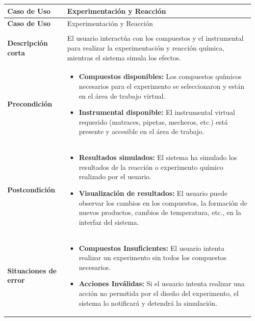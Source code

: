 \begin{longtable}{>{\raggedright\arraybackslash}m{} >{\raggedright\arraybackslash}m{}}
    \toprule\toprule
    \textbf{Caso de Uso} & Experimentación y Reacción \\
    \midrule\midrule
    \endfirsthead

    \toprule\toprule
    \textbf{Caso de Uso} & Experimentación y Reacción \\
    \midrule\midrule
    \endhead

    \midrule
    \multicolumn{2}{r}{\textit{Continúa en la siguiente página}} \\
    \midrule
    \endfoot

    \endlastfoot

    \textbf{Descripción corta} & El usuario interactúa con los compuestos y el instrumental para realizar la experimentación y reacción química, mientras el sistema simula los efectos.\\
    \midrule
    \textbf{Precondición} & 
    \begin{itemize}
        \item \textbf{Compuestos disponibles:} Los compuestos químicos necesarios para el experimento se seleccionaron y están en el área de trabajo virtual.
        \item \textbf{Instrumental disponible: }El instrumental virtual requerido (matraces, pipetas, mecheros, etc.) está presente y accesible en el área de trabajo.
    \end{itemize}\\
    \midrule
    \textbf{Postcondición} & 
    \begin{itemize}
        \item \textbf{Resultados simulados:} El sistema ha simulado los resultados de la reacción o experimento químico realizado por el usuario.
        \item \textbf{Visualización de resultados:} El usuario puede observar los cambios en los compuestos, la formación de nuevos productos, cambios de temperatura, etc., en la interfaz del sistema.
    \end{itemize}\\
    \midrule
    \textbf{Situaciones de error} & 
    \begin{itemize}
        \item \textbf{Compuestos Insuficientes:} El usuario intenta realizar un experimento sin todos los compuestos necesarios.
        \item \textbf{Acciones Inválidas:} Si el usuario intenta realizar una acción no permitida por el diseño del experimento, el sistema lo notificará y detendrá la simulación.

\end{itemize}
\end{longtable}
